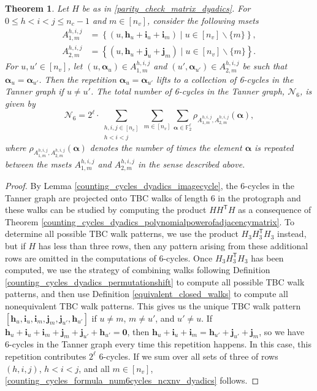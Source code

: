 \documentclass[11pt]{article}
\newtheorem{theorem}[lemma]{Theorem}
\theoremstyle{plain}
\theoremstyle{plain}
\theoremstyle{definition}
\numberwithin{theo}{section}
\newcommand{\bzero}{\mathbf{0}}
\newcommand{\bh}{{\mathbf h}}
\newcommand{\bi}{{\mathbf i}}
\newcommand{\bj}{{\mathbf j}}
\newcommand{\balpha}{{\boldsymbol \alpha}}
\newcounter{alp}
\newcounter{rom}
\begin{document}
\begin{theorem}
\label{counting_cycles_thm_6cycles_ncxnv_dyadics}
Let $H$ be as in \eqref{parity_check_matrix_dyadics}. For 
$0\leq h<i<j\leq n_c-1$ and $m\in[n_v]$, consider the following msets
\begin{align*}
A_{1,m}^{h,i,j} &= \left\{(u,\bh_u+\bi_u+\bi_m) \mid u\in[n_v]\backslash\{m\} \right\}, \\
A_{2,m}^{h,i,j} &= \left\{(u,\bh_u+\bj_u+\bj_m) \mid u\in[n_v]\backslash\{m\} \right\}.
\end{align*}
\noindent For 
$u,u'\in[n_v]$, let $(u,\balpha_u)\in A_{1,m}^{h,i,j}$ and $(u',\balpha_{u'})\in A_{2,m}^{h,i,j}$ be such that $\balpha_u=\balpha_{u'}$. Then the repetition  
$\balpha_u=\balpha_{u'}$ lifts to a collection of 6-cycles in the Tanner graph if 
$u\neq u'$. The total number of 6-cycles in the Tanner graph, $\mathcal{N}_6$, is given by
\begin{equation}
\label{counting_cycles_formula_num6cycles_ncxnv_dyadics}
\mathcal{N}_6 = 2^\ell\cdot\sum_{\substack{h,i,j\in[n_c]\\h<i<j}}\sum_{m\in[n_v]}\sum_{\balpha\in\mathbb{F}_2^\ell}\rho_{A_{1,m}^{h,i,j},A_{2,m}^{h,i,j}}(\balpha),
\end{equation}
where
$\rho_{A_{1,m}^{h,i,j},A_{2,m}^{h,i,j}}(\balpha)$ denotes the number of times the element $\balpha$ is repeated between the msets 
$A_{1,m}^{h,i,j}$ and $A_{2,m}^{h,i,j}$ in the sense described above.
\end{theorem}
\begin{proof}
By Lemma \ref{counting_cycles_dyadics_imagecycle}, the 6-cycles in the Tanner graph are projected onto TBC walks of length 6 in the protograph and these walks can be studied by computing the product $HH^\mathsf{T}H$ as a consequence of Theorem \ref{counting_cycles_dyadics_polynomialpowerofadjacencymatrix}. To determine all possible TBC walk patterns, we use the product $H_3H_3^\mathsf{T}H_3$ instead, but if $H$ has less than three rows, then any pattern arising from these additional rows are omitted in the computations of 6-cycles. Once $H_3H_3^\mathsf{T}H_3$ has been computed, we use the strategy of combining walks following Definition \ref{counting_cycles_dyadics_permutationshift} to compute all possible TBC walk patterns, and then use Definition \ref{equivalent_closed_walks} to compute all nonequivalent TBC walk patterns. This gives us the unique TBC walk pattern $[\bh_u,\bi_u,\bi_m,\bj_m,\bj_{u'},\bh_{u'}]$ if $u\neq m$, $m\neq u'$, and $u'\neq u$. If $\bh_u+\bi_u+\bi_m+\bj_m+\bj_{u'}+\bh_{u'}=\bzero$, then $\bh_u+\bi_u+\bi_m=\bh_{u'}+\bj_{u'}+\bj_m$, so we have 6-cycles in the Tanner graph every time this repetition happens. In this case, this repetition contributes $2^\ell$ 6-cycles. If we sum over all sets of three of rows $(h,i,j)$, $h<i<j$, and all $m\in[n_v]$, \eqref{counting_cycles_formula_num6cycles_ncxnv_dyadics} follows.
\end{proof}
\end{document}
